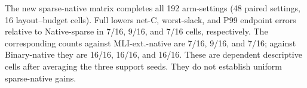 The new sparse-native matrix completes all 192 arm-settings (48 paired settings, 16 layout--budget cells). Full lowers net-C, worst-slack, and P99 endpoint errors relative to Native-sparse in 7/16, 9/16, and 7/16 cells, respectively. The corresponding counts against MLI-ext.-native are 7/16, 9/16, and 7/16; against Binary-native they are 16/16, 16/16, and 16/16. These are dependent descriptive cells after averaging the three support seeds. They do not establish uniform sparse-native gains.
